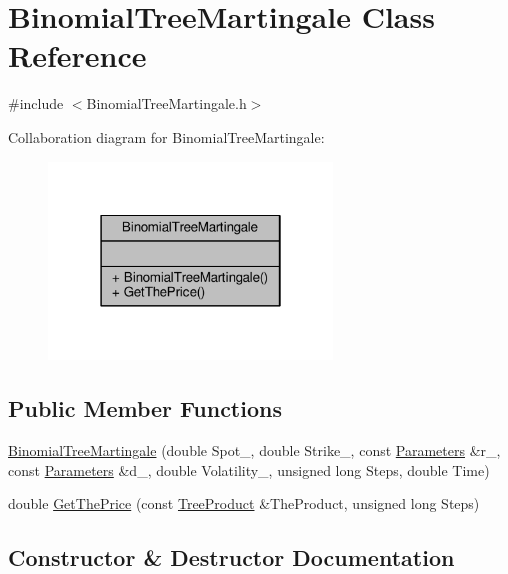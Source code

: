 \hypertarget{classBinomialTreeMartingale}{}\section{Binomial\+Tree\+Martingale Class Reference}
\label{classBinomialTreeMartingale}


{\ttfamily \#include $<$Binomial\+Tree\+Martingale.\+h$>$}



Collaboration diagram for Binomial\+Tree\+Martingale\+:
\nopagebreak
\begin{figure}[H]
\begin{center}
\leavevmode
\includegraphics[width=214pt]{classBinomialTreeMartingale__coll__graph}
\end{center}
\end{figure}
\subsection*{Public Member Functions}
\begin{DoxyCompactItemize}
\item 
\hyperlink{classBinomialTreeMartingale_a3d478aeaa74ebbdde22d699cce66eaf4}{Binomial\+Tree\+Martingale} (double Spot\+\_\+, double Strike\+\_\+, const \hyperlink{classParameters}{Parameters} \&r\+\_\+, const \hyperlink{classParameters}{Parameters} \&d\+\_\+, double Volatility\+\_\+, unsigned long Steps, double Time)
\item 
double \hyperlink{classBinomialTreeMartingale_a9cc63624311a9f63664fd08aa78533f9}{Get\+The\+Price} (const \hyperlink{classTreeProduct}{Tree\+Product} \&The\+Product, unsigned long Steps)
\end{DoxyCompactItemize}


\subsection{Constructor \& Destructor Documentation}
\hypertarget{classBinomialTreeMartingale_a3d478aeaa74ebbdde22d699cce66eaf4}{}\label{classBinomialTreeMartingale_a3d478aeaa74ebbdde22d699cce66eaf4} 
